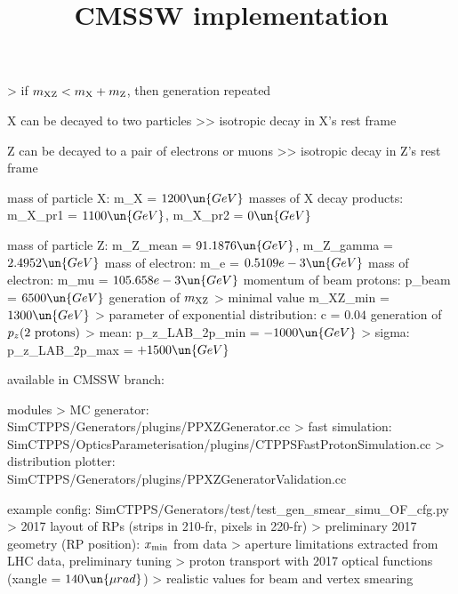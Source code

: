 \>> if $m_{\rm XZ} < m_{\rm X} + m_{\rm Z}$, then generation repeated

\> X can be decayed to two particles
\>>> isotropic decay in X's rest frame

\> Z can be decayed to a pair of electrons or muons
\>>> isotropic decay in Z's rest frame


\newpage %

\> mass of particle X: m\_X = $1200\un{GeV}$
\> masses of X decay products: m\_X\_pr1 = $1100\un{GeV}$, m\_X\_pr2 = $0\un{GeV}$

\> mass of particle Z: m\_Z\_mean = $91.1876\un{GeV}$, m\_Z\_gamma = $2.4952\un{GeV}$
\> mass of electron: m\_e = $0.5109e-3\un{GeV}$
\> mass of electron: m\_mu = $105.658e-3\un{GeV}$
\> momentum of beam protons: p\_beam = $6500\un{GeV}$
\> generation of $m_{\rm XZ}$
\>> minimal value m\_XZ\_min = $1300\un{GeV}$
\>> parameter of exponential distribution: c = $0.04$
\> generation of $p_z(\hbox{2 protons})$
\>> mean: p\_z\_LAB\_2p\_min = $-1000\un{GeV}$
\>> sigma: p\_z\_LAB\_2p\_max = $+1500\un{GeV}$


\newpage %
\title{CMSSW implementation}

\> available in CMSSW branch:\\ 

\NormalFonts

\> modules
\>> MC generator:\\ SimCTPPS/Generators/plugins/PPXZGenerator.cc
\>> fast simulation:\\ SimCTPPS/OpticsParameterisation/plugins/CTPPSFastProtonSimulation.cc
\>> distribution plotter:\\ SimCTPPS/Generators/plugins/PPXZGeneratorValidation.cc

\> example config: SimCTPPS/Generators/test/test\_gen\_smear\_simu\_OF\_cfg.py
\>> 2017 layout of RPs (strips in 210-fr, pixels in 220-fr)
\>> preliminary 2017 geometry (RP position): $x_{\rm min}$ from data
\>> aperture limitations extracted from LHC data, preliminary tuning
\>> proton transport with 2017 optical functions (xangle = $140\un{\mu rad}$)
\>> realistic values for beam and vertex smearing


